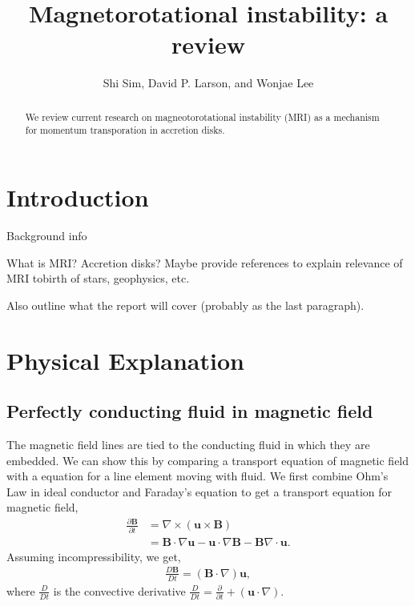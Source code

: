 \documentclass{jfm}
\title[Magnetorotational instability]{Magnetorotational instability: a review}
\author[S. Sim, D.~P. Larson, and W. Lee]{Shi Sim, David P. Larson, 
    and Wonjae Lee}
\affiliation{University of California, San Diego}
\newcommand{\del}{\nabla}
\begin{document}
\maketitle


\begin{abstract}
We review current research on magneotorotational instability (MRI) as a 
mechanism for momentum transporation in accretion disks.
\end{abstract}


\section{Introduction}
\label{sec:intro}
Background info

What is MRI? Accretion disks? Maybe provide references to explain relevance of 
MRI tobirth of stars, geophysics, etc.

Also outline what the report will cover (probably as the last paragraph).



\section{Physical Explanation}


%
%
\subsection{Perfectly conducting fluid in magnetic field}

The magnetic field lines are tied to the conducting fluid in which they are embedded.
We can show this by comparing a transport equation of magnetic field with a equation for a line element moving with fluid. 
We first combine Ohm's Law in ideal 
conductor and Faraday's equation to get a transport equation for magnetic 
field,
\begin{align}
    \frac{\partial \mathbf{B}}{\partial t} &= \del \times (\mathbf{u}\times \mathbf{B}) \nonumber \\
    &=\mathbf{B}\cdot\del \mathbf{u} - {\mathbf{u}\cdot\del}\mathbf{B} -\mathbf{B}\del\cdot\mathbf{u}.
\end{align}
Assuming incompressibility, we get,
\begin{align}
    \frac{D \mathbf{B}}{D t} = (\mathbf{B}\cdot \del) \mathbf{u},
\end{align}
where $\frac{D}{Dt}$ is the convective derivative $\frac{D}{Dt}=\frac{\partial}{\partial t}+(\mathbf{u}\cdot\del)$.
\end{document}
